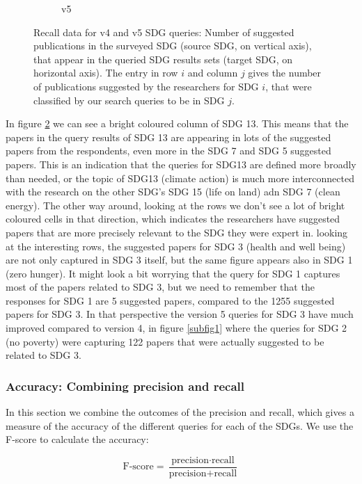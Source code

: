 \documentclass{article}
\begin{document}
\begin{figure}[H]
\begin{subfigure}{0.49\textwidth}
            \caption{v5}
            \label{subfig2}
        \end{subfigure}
        \caption{Recall data for v4 and v5 SDG queries:  Number of suggested publications in the surveyed SDG (source SDG, on vertical axis), that appear in the queried SDG results sets (target SDG, on horizontal axis). The entry in row $i$ and column $j$ gives the number of publications suggested by the researchers for SDG $i$, that were classified by our search queries to be in SDG $j$.}
\end{figure}

In figure \ref{subfig2} we can see a bright coloured column of SDG 13. This means that the papers in the query results of SDG 13 are appearing in lots of the suggested papers from the respondents, even more in the SDG 7 and SDG 5 suggested papers. This is an indication that the queries for SDG13 are defined more broadly than needed, or the topic of SDG13 (climate action) is much more interconnected with the research on the other SDG's SDG 15 (life on land) adn SDG 7 (clean energy). The other way around, looking at the rows we don't see a lot of bright coloured cells in that direction, which indicates the researchers have suggested papers that are more precisely relevant to the SDG they were expert in. looking at the interesting rows, the suggested papers for SDG 3 (health and well being) are not only captured in SDG 3 itself, but the same figure appears also in SDG 1 (zero hunger). It might look a bit worrying that the query for SDG 1 captures most of the papers related to SDG 3, but we need to remember that the responses for SDG 1 are 5 suggested papers, compared to the 1255 suggested papers for SDG 3. In that perspective the version 5 queries for SDG 3 have much improved compared to version 4, in figure \ref{subfig1} where the queries for SDG 2 (no poverty) were capturing 122 papers that were actually suggested to be related to SDG 3.


\subsubsection{Accuracy: Combining precision and recall}
In this section we combine the outcomes of the precision and recall, which gives a measure of the accuracy of the different queries for each of the SDGs. We use the F-score to calculate the accuracy:

\begin{equation*}
    \text{F-score} = \frac{\text{precision}\cdot\text{recall}}{\text{precision}+\text{recall}}
\end{equation*}
\end{document}
